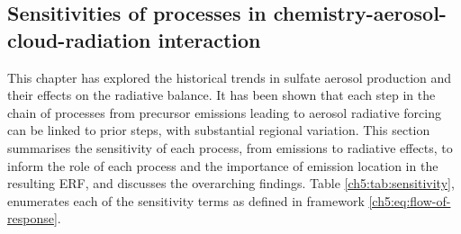 \subsection{Sensitivities of processes in chemistry-aerosol-cloud-radiation interaction}

This chapter has explored the historical trends in sulfate aerosol production and their effects on the radiative balance. It has been shown that each step in the chain of processes from precursor emissions leading to aerosol radiative forcing can be linked to prior steps, with substantial regional variation. This section summarises the sensitivity of each process, from emissions to radiative effects, to inform the role of each process and the importance of emission location in the resulting ERF, and discusses the overarching findings. Table 
\ref{ch5:tab:sensitivity}, enumerates each of the sensitivity terms as defined in framework \ref{ch5:eq:flow-of-response}.


\clearpage

